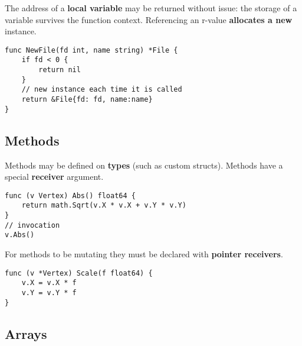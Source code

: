 \documentclass{article}
\begin{document}
\begin{paracol}{2}
\noindent The address of a \textbf{local variable} may be returned without issue: the storage of a variable survives the function context. Referencing an r-value \textbf{allocates a new} instance.

\switchcolumn

\begin{lstlisting}
func NewFile(fd int, name string) *File {
    if fd < 0 {
        return nil
    }
    // new instance each time it is called
    return &File{fd: fd, name:name}
}
\end{lstlisting}

\switchcolumn*
\end{paracol}

\subsection{Methods}

\begin{paracol}{2}
Methods may be defined on \textbf{types} (such as custom structs). Methods have a special \textbf{receiver} argument.

\switchcolumn
\begin{lstlisting}
func (v Vertex) Abs() float64 {
    return math.Sqrt(v.X * v.X + v.Y * v.Y)
}
// invocation
v.Abs()
\end{lstlisting}

\switchcolumn*

\noindent For methods to be mutating they must be declared with \textbf{pointer receivers}.

\switchcolumn
\begin{lstlisting}
func (v *Vertex) Scale(f float64) {
    v.X = v.X * f
    v.Y = v.Y * f
}
\end{lstlisting}


\end{paracol}

\subsection{Arrays}
\end{document}
